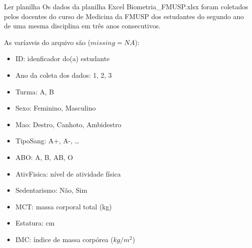 \documentclass[
  ignorenonframetext,
]{beamer}
\providecommand{\tightlist}{%
  \setlength{\itemsep}{0pt}\setlength{\parskip}{0pt}}
\begin{document}
\begin{frame}[fragile]{Ler planilha}
\protect\hypertarget{ler-planilha}{}
Os dados da planilha Excel Biometria\_FMUSP.xlsx foram coletados pelos
docentes do curso de Medicina da FMUSP dos estudantes do segundo ano de
uma mesma disciplina em três anos consecutivos.

As varíaveis do arquivo são (\(missing = NA\)):

\begin{itemize}
\tightlist
\item
  ID: idenficador do(a) estudante\\
\item
  Ano da coleta dos dados: 1, 2, 3\\
\item
  Turma: A, B\\
\item
  Sexo: Feminino, Masculino
\item
  Mao: Destro, Canhoto, Ambidestro\\
\item
  TipoSang: A+, A-, \ldots{}
\item
  ABO: A, B, AB, O
\item
  AtivFisica: nível de atividade física
\item
  Sedentarismo: Não, Sim\\
\item
  MCT: massa corporal total (kg)
\item
  Estatura: cm\\
\item
  IMC: índice de massa corpórea (\(kg/m^2\))
\end{itemize}


\end{frame}
\end{document}
